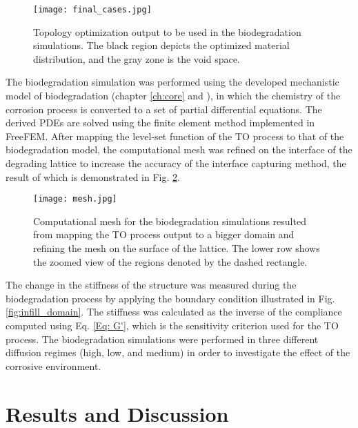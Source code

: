 \begin{figure}[h]
\centering
\medskip
\texttt{[image: final\_cases.jpg]}
\caption[Topology optimization output to be used in the biodegradation simulations]{Topology optimization output to be used in the biodegradation simulations. The black region depicts the optimized material distribution, and the gray zone is the void space. } \label{fig:infill_final_cases}
\end{figure}

The biodegradation simulation was performed using the developed mechanistic model of biodegradation (chapter \ref{ch:core} and \cite{Barzegari2021}), in which the chemistry of the corrosion process is converted to a set of partial differential equations. The derived \gls{PDE}s are solved using the finite element method implemented in FreeFEM. After mapping the level-set function of the \gls{TO} process to that of the biodegradation model, the computational mesh was refined on the interface of the degrading lattice to increase the accuracy of the interface capturing method, the result of which is demonstrated in Fig. \ref{fig:infill_mesh}.


\begin{figure}[h]
\centering
\medskip
\texttt{[image: mesh.jpg]}
\caption[Computational mesh for the biodegradation simulations]{Computational mesh for the biodegradation simulations resulted from mapping the \gls{TO} process output to a bigger domain and refining the mesh on the surface of the lattice. The lower row shows the zoomed view of the regions denoted by the dashed rectangle.} \label{fig:infill_mesh}
\end{figure}

The change in the stiffness of the structure was measured during the biodegradation process by applying the boundary condition illustrated in Fig. \ref{fig:infill_domain}. The stiffness was calculated as the inverse of the compliance computed using Eq. \ref{Eq: G'}, which is the sensitivity criterion used for the \gls{TO} process. The biodegradation simulations were performed in three different diffusion regimes (high, low, and medium) in order to investigate the effect of the corrosive environment. 



\section{Results and Discussion}\label{section:infill_results}

